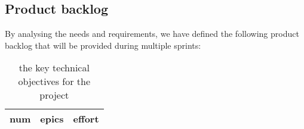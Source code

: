 \subsection{Product backlog}
By analysing the needs and requirements, we have defined the following product backlog that will be provided during multiple sprints:
\begin{longtable}[c]{
    |p{}
    |p{}|
    p{}|
    }
    \caption{the key technical objectives for the project}
    \label{tab:productBacklog}                                                                          \\
    \hline

    num & epics                                                                                & effort \\ \hline


\end{longtable}
